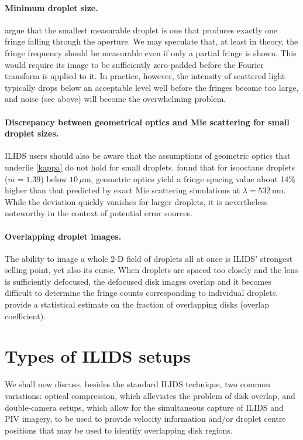 \documentclass[11.5pt,oneside]{book}
\begin{document}
\paragraph{Minimum droplet size.}
\citet{Damaschke02} argue that the smallest measurable droplet is one that
produces exactly one fringe falling through the aperture. We may speculate that, at least
in theory, the fringe frequency should be measurable even if only a partial
fringe is shown. This would require its image to be sufficiently zero-padded
before the Fourier transform is applied to it. In practice, however, the
intensity of scattered light typically drops below an acceptable level well before
the fringes become too large, and noise (see above) will become the overwhelming
problem.

\paragraph{Discrepancy between geometrical optics and Mie scattering for small droplet sizes.}
ILIDS users should also be aware that the assumptions of geometric optics
that underlie \eqref{kappa} do not hold for small droplets. \citet{Mounaim99}
found that for isooctane droplets ($m=1.39$) below $10\,\mu$m, geometric optics
yield a fringe spacing value about 14\% higher than that predicted by exact Mie
scattering simulations at $\lambda=532\,$nm. While the deviation quickly
vanishes for larger droplets, it is nevertheless noteworthy in the context of
potential error sources.

\paragraph{Overlapping droplet images.}
The ability to image a whole 2-D field of droplets all at once is ILIDS' strongest
selling point, yet also its curse. When droplets are spaced too closely and the
lens is sufficiently defocused, the defocused disk images overlap and it becomes
difficult to determine the fringe counts corresponding to individual droplets.
\citet{Damaschke02} provide a statistical estimate on the fraction of
overlapping disks (overlap coefficient). 


\section{Types of ILIDS setups}
\label{sec:ipi-setup}

We shall now discuss, besides the standard ILIDS technique, two common
variations: optical compression, which alleviates the problem of disk overlap,
and double-camera setups, which allow for the simultaneous capture of ILIDS and
PIV imagery, to be used to provide velocity information and/or droplet centre
positions that may be used to identify overlapping disk regions.
\end{document}
